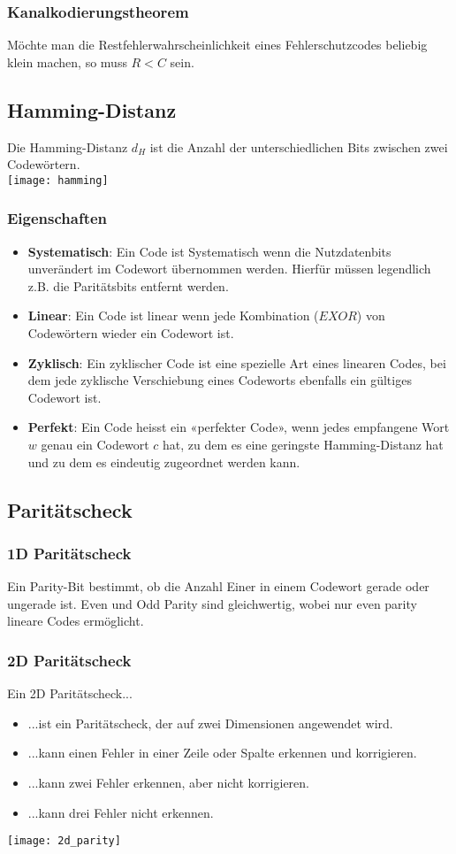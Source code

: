 \subsubsection{Kanalkodierungstheorem}
Möchte man die Restfehlerwahrscheinlichkeit eines Fehlerschutzcodes beliebig klein machen,
so muss $R < C$ sein.
\subsection{Hamming-Distanz}
Die Hamming-Distanz $d_H$ ist die Anzahl der unterschiedlichen Bits zwischen zwei Codewörtern.\\
\texttt{[image: hamming]}
\subsubsection{Eigenschaften}
\begin{itemize}
	\item \textbf{Systematisch}: Ein Code ist Systematisch wenn die Nutzdatenbits unverändert im Codewort übernommen werden.
	      Hierfür müssen legendlich z.B. die Paritätsbits entfernt werden.
	\item \textbf{Linear}: Ein Code ist linear wenn jede Kombination ($EXOR$) von Codewörtern wieder ein Codewort ist.
	\item \textbf{Zyklisch}: Ein zyklischer Code ist eine spezielle Art eines linearen Codes, bei dem jede
	      zyklische Verschiebung eines Codeworts ebenfalls ein gültiges Codewort ist.
	\item \textbf{Perfekt}: Ein Code heisst ein «perfekter Code», wenn jedes empfangene Wort $w$
	      genau ein Codewort $c$ hat, zu dem es eine geringste Hamming-Distanz
	      hat und zu dem es eindeutig zugeordnet werden kann.
\end{itemize}
\subsection{Paritätscheck}
\subsubsection{1D Paritätscheck}
Ein Parity-Bit bestimmt, ob die Anzahl Einer in einem Codewort gerade oder ungerade ist.
Even und Odd Parity sind gleichwertig, wobei nur even parity lineare Codes ermöglicht.
\subsubsection{2D Paritätscheck}
Ein 2D Paritätscheck...
\begin{itemize}
	\item ...ist ein Paritätscheck, der auf zwei Dimensionen angewendet wird.
	\item ...kann einen Fehler in einer Zeile oder Spalte erkennen und korrigieren.
	\item ...kann zwei Fehler erkennen, aber nicht korrigieren.
	\item ...kann drei Fehler nicht erkennen.
\end{itemize}
\texttt{[image: 2d\_parity]}

